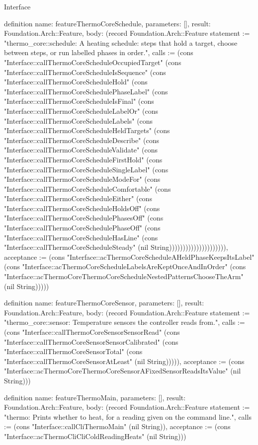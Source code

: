 \begin{lexlean}{Interface}
\begin{semanticmodule}
definition{
  name: featureThermoCoreSchedule,
  parameters: [],
  result: Foundation.Arch::Feature,
  body: (record Foundation.Arch::Feature {statement := "thermo_core::schedule: A heating schedule: steps that hold a target, choose between steps, or run labelled phases in order.", calls := (cons "Interface::callThermoCoreScheduleOccupiedTarget" (cons "Interface::callThermoCoreScheduleIsSequence" (cons "Interface::callThermoCoreScheduleHold" (cons "Interface::callThermoCoreSchedulePhaseLabel" (cons "Interface::callThermoCoreScheduleIsFinal" (cons "Interface::callThermoCoreScheduleLabelOr" (cons "Interface::callThermoCoreScheduleLabels" (cons "Interface::callThermoCoreScheduleHeldTargets" (cons "Interface::callThermoCoreScheduleDescribe" (cons "Interface::callThermoCoreScheduleValidate" (cons "Interface::callThermoCoreScheduleFirstHold" (cons "Interface::callThermoCoreScheduleSingleLabel" (cons "Interface::callThermoCoreScheduleModeFor" (cons "Interface::callThermoCoreScheduleComfortable" (cons "Interface::callThermoCoreScheduleEither" (cons "Interface::callThermoCoreScheduleHoldsOff" (cons "Interface::callThermoCoreSchedulePhasesOff" (cons "Interface::callThermoCoreSchedulePhaseOff" (cons "Interface::callThermoCoreScheduleHasLine" (cons "Interface::callThermoCoreScheduleSteady" (nil String))))))))))))))))))))), acceptance := (cons "Interface::acThermoCoreScheduleAHeldPhaseKeepsItsLabel" (cons "Interface::acThermoCoreScheduleLabelsAreKeptOnceAndInOrder" (cons "Interface::acThermoCoreThermoCoreScheduleNestedPatternsChooseTheArm" (nil String))))})
}

definition{
  name: featureThermoCoreSensor,
  parameters: [],
  result: Foundation.Arch::Feature,
  body: (record Foundation.Arch::Feature {statement := "thermo_core::sensor: Temperature sensors the controller reads from.", calls := (cons "Interface::callThermoCoreSensorSensorRead" (cons "Interface::callThermoCoreSensorSensorCalibrated" (cons "Interface::callThermoCoreSensorTotal" (cons "Interface::callThermoCoreSensorAtLeast" (nil String))))), acceptance := (cons "Interface::acThermoCoreThermoCoreSensorAFixedSensorReadsItsValue" (nil String))})
}

definition{
  name: featureThermoMain,
  parameters: [],
  result: Foundation.Arch::Feature,
  body: (record Foundation.Arch::Feature {statement := "thermo: Prints whether to heat, for a reading given on the command line.", calls := (cons "Interface::callCliThermoMain" (nil String)), acceptance := (cons "Interface::acThermoCliCliColdReadingHeats" (nil String))})
}


\end{semanticmodule}
\end{lexlean}
